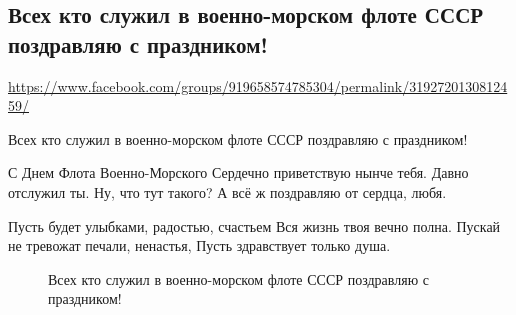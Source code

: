 
 
  
\clearpage
\subsection{Всех кто служил в военно-морском флоте СССР поздравляю с праздником!}
\label{sec:26_07_2020.fb.lnr.7}
\url{https://www.facebook.com/groups/919658574785304/permalink/3192720130812459/}


Всех кто служил в военно-морском флоте СССР поздравляю с праздником!

С Днем Флота Военно-Морского
Сердечно приветствую нынче тебя.
Давно отслужил ты. Ну, что тут такого?
А всё ж поздравляю от сердца, любя.

Пусть будет улыбками, радостью, счастьем
Вся жизнь твоя вечно полна.
Пускай не тревожат печали, ненастья,
Пусть здравствует только душа.

\begin{figure}[ht]
 \centering
 \caption{Всех кто служил в военно-морском флоте СССР поздравляю с праздником!}
 \label{fig:}
\end{figure}
  

